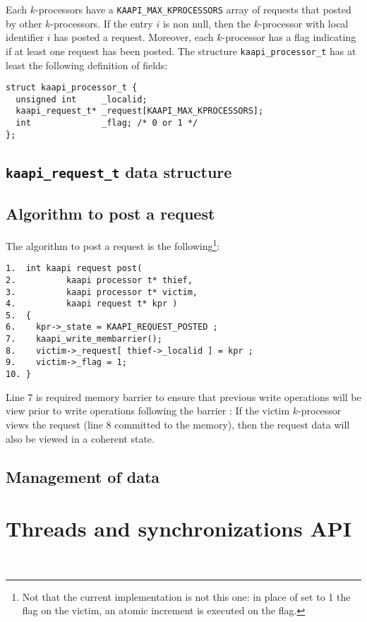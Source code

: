 \documentclass[12pt]{report}
\begin{document}
Each $k$-processors have a \verb+KAAPI_MAX_KPROCESSORS+ array of requests that posted by other $k$-processors.
If the entry $i$ is non null, then the $k$-processor with local identifier $i$ has posted a request. Moreover, each $k$-processor has a flag indicating if at least one request has been posted. The structure \texttt{kaapi\_processor\_t} has at least the following definition of fields:
\begin{verbatim}
struct kaapi_processor_t {
  unsigned int     _localid;
  kaapi_request_t* _request[KAAPI_MAX_KPROCESSORS]; 
  int              _flag; /* 0 or 1 */
};
\end{verbatim}

\subsection{\texttt{kaapi\_request\_t} data structure}


\subsection{Algorithm to post a request}
The algorithm to post a request is the following\footnote{Not that the current implementation is not this one: in place of set to 1 the flag on the victim, an atomic increment is executed on the flag.}:
\begin{verbatim}
1.  int kaapi request post( 
2.          kaapi processor t* thief, 
3.          kaapi processor t* victim, 
4.          kaapi request t* kpr )
5.  {
6.    kpr->_state = KAAPI_REQUEST_POSTED ;
7.    kaapi_write_membarrier();
8.    victim->_request[ thief->_localid ] = kpr ;
9.    victim->_flag = 1;
10. }
\end{verbatim}
Line 7 is required memory barrier to ensure that previous write operations will be view prior to write operations following the barrier : If the victim $k$-processor views the request (line 8 committed to the memory), then the request data will also be viewed in a coherent state.

\subsection{Management of data}


\section{Threads and synchronizations API}
\\
\end{document}
